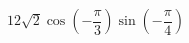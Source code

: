 \begin{ex}[type=calculate]
	\begin{condition}
		\( 12\sqrt{2}\cos\left( -\dfrac{\pi}{3} \right)\sin\left( -\dfrac{\pi}{4} \right) \)
	\end{condition}
\end{ex}